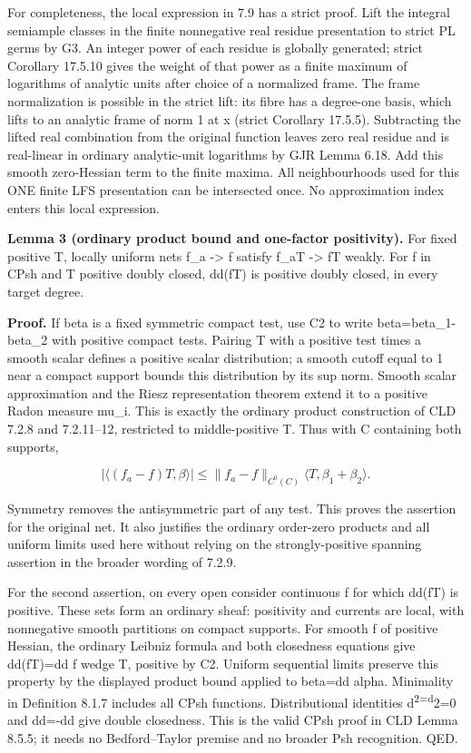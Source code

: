 \documentclass[
  11pt,
]{article}
\begin{document}
For completeness, the local expression in 7.9 has a strict proof. Lift
the integral semiample classes in the finite nonnegative real residue
presentation to strict PL germs by G3. An integer power of each residue
is globally generated; strict Corollary 17.5.10 gives the weight of that
power as a finite maximum of logarithms of analytic units after choice
of a normalized frame. The frame normalization is possible in the strict
lift: its fibre has a degree-one basis, which lifts to an analytic frame
of norm 1 at x (strict Corollary 17.5.5). Subtracting the lifted real
combination from the original function leaves zero real residue and is
real-linear in ordinary analytic-unit logarithms by GJR Lemma 6.18. Add
this smooth zero-Hessian term to the finite maxima. All neighbourhoods
used for this ONE finite LFS presentation can be intersected once. No
approximation index enters this local expression.

\textbf{Lemma 3 (ordinary product bound and one-factor positivity).} For
fixed positive T, locally uniform nets f\_a -\textgreater{} f satisfy
f\_aT -\textgreater{} fT weakly. For f in CPsh and T positive doubly
closed, dd(fT) is positive doubly closed, in every target degree.

\textbf{Proof.} If beta is a fixed symmetric compact test, use C2 to
write beta=beta\_1-beta\_2 with positive compact tests. Pairing T with a
positive test times a smooth scalar defines a positive scalar
distribution; a smooth cutoff equal to 1 near a compact support bounds
this distribution by its sup norm. Smooth scalar approximation and the
Riesz representation theorem extend it to a positive Radon measure
mu\_i. This is exactly the ordinary product construction of CLD 7.2.8
and 7.2.11--12, restricted to middle-positive T. Thus with C containing
both supports,

\[
\bigl|\langle(f_a-f)T,\beta\rangle\bigr|\le\|f_a-f\|_{C^0(C)}\langle T,\beta_1+\beta_2\rangle.
\]

Symmetry removes the antisymmetric part of any test. This proves the
assertion for the original net. It also justifies the ordinary
order-zero products and all uniform limits used here without relying on
the strongly-positive spanning assertion in the broader wording of
7.2.9.

For the second assertion, on every open consider continuous f for which
dd(fT) is positive. These sets form an ordinary sheaf: positivity and
currents are local, with nonnegative smooth partitions on compact
supports. For smooth f of positive Hessian, the ordinary Leibniz formula
and both closedness equations give dd(fT)=dd f wedge T, positive by C2.
Uniform sequential limits preserve this property by the displayed
product bound applied to beta=dd alpha. Minimality in Definition 8.1.7
includes all CPsh functions. Distributional identities
d\textquotesingle{}\textsuperscript{2=d\textquotesingle\textquotesingle{}}2=0
and
d\textquotesingle d\textquotesingle\textquotesingle=-d\textquotesingle\textquotesingle d\textquotesingle{}
give double closedness. This is the valid CPsh proof in CLD Lemma 8.5.5;
it needs no Bedford--Taylor premise and no broader Psh recognition. QED.
\end{document}

